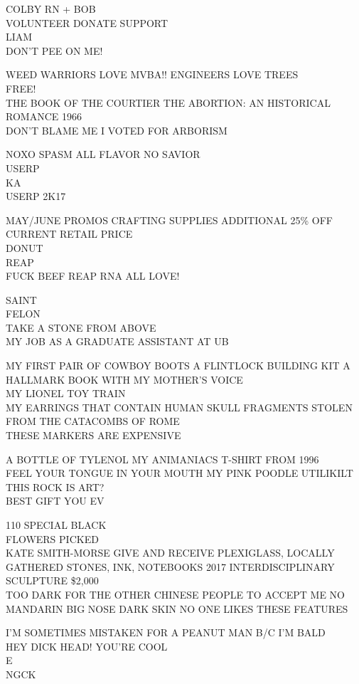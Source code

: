 \documentclass[10pt,letterpaper]{article}
\begin{document}
COLBY RN + BOB\\
VOLUNTEER DONATE SUPPORT\\
LIAM\\
DON'T PEE ON ME!

WEED WARRIORS LOVE MVBA!!  ENGINEERS LOVE TREES\\
FREE!\\
THE BOOK OF THE COURTIER THE ABORTION: AN HISTORICAL ROMANCE 1966\\
DON'T BLAME ME I VOTED FOR ARBORISM

NOXO SPASM ALL FLAVOR NO SAVIOR\\
USERP\\
KA\\
USERP 2K17

MAY/JUNE PROMOS CRAFTING SUPPLIES ADDITIONAL 25\% OFF CURRENT RETAIL PRICE\\
DONUT\\
REAP\\
FUCK BEEF REAP RNA ALL LOVE!

SAINT\\
FELON\\
TAKE A STONE FROM ABOVE\\
MY JOB AS A GRADUATE ASSISTANT AT UB

MY FIRST PAIR OF COWBOY BOOTS A FLINTLOCK BUILDING KIT A HALLMARK BOOK WITH MY MOTHER'S VOICE\\
MY LIONEL TOY TRAIN\\
MY EARRINGS THAT CONTAIN HUMAN SKULL FRAGMENTS STOLEN FROM THE CATACOMBS OF ROME\\
THESE MARKERS ARE EXPENSIVE

A BOTTLE OF TYLENOL MY ANIMANIACS T{-}SHIRT FROM 1996\\
FEEL YOUR TONGUE IN YOUR MOUTH MY PINK POODLE UTILIKILT\\
THIS ROCK IS ART?\\
BEST GIFT YOU EV

110 SPECIAL BLACK\\
FLOWERS PICKED\\
KATE SMITH{-}MORSE GIVE AND RECEIVE PLEXIGLASS, LOCALLY GATHERED STONES, INK, NOTEBOOKS 2017 INTERDISCIPLINARY SCULPTURE \$2,000\\
TOO DARK FOR THE OTHER CHINESE PEOPLE TO ACCEPT ME NO MANDARIN BIG NOSE DARK SKIN NO ONE LIKES THESE FEATURES

I'M SOMETIMES MISTAKEN FOR A PEANUT MAN B/C I'M BALD\\
HEY DICK HEAD!  YOU'RE COOL\\
E\\
NGCK
\end{document}
